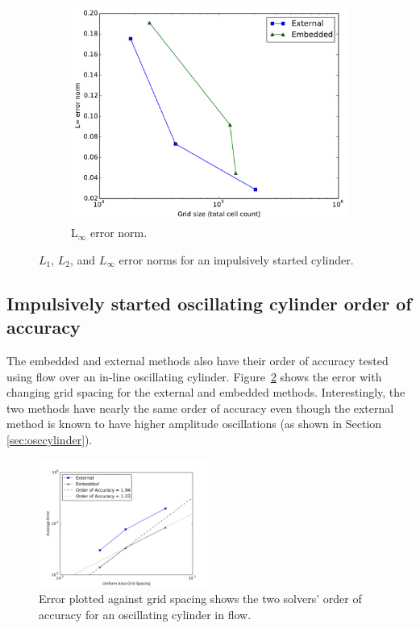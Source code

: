 \documentclass[preprint,12pt]{elsarticle}
\begin{document}
\begin{figure}[H]
	\begin{subfigure}{0.5\textwidth}
		\includegraphics[width=\linewidth]{Linf_error_norm}
		\caption{L$_\infty$ error norm.}
	\end{subfigure}
	\caption{$L_1$, $L_2$, and $L_\infty$ error norms for an impulsively started cylinder.}
	\label{fig:error norm}
\end{figure}

\subsection{Impulsively started oscillating cylinder order of accuracy}
The embedded and external methods also have their order of accuracy tested using flow over an in-line oscillating cylinder.
Figure~\ref{fig:oscerror} shows the error with changing grid spacing for the external and embedded methods.
Interestingly, the two methods have nearly the same order of accuracy even though the external method is known to have higher amplitude oscillations (as shown in Section \ref{sec:osccylinder}).

\begin{figure}[!htb]
	\centering
	\includegraphics[width=0.5\textwidth]{error_oscflow}
	\caption{Error plotted against grid spacing shows the two solvers' order of accuracy for an oscillating cylinder in flow.}
	\label{fig:oscerror}
\end{figure}
\end{document}
